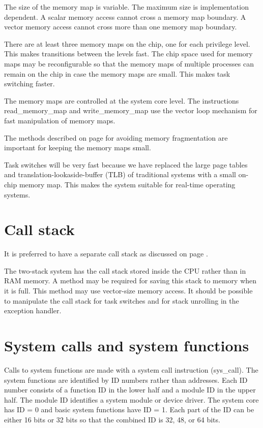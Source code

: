 \documentclass[forwardcom.tex]{subfiles}
\begin{document}
The size of the memory map is variable. The maximum size is implementation dependent.
A scalar memory access cannot cross a memory map boundary. A vector memory access cannot cross more than one memory map boundary.
\vspace{2mm}

There are at least three memory maps on the chip, one for each privilege level. This makes transitions between the levels fast. The chip space used for memory maps may be reconfigurable so that the memory maps of multiple processes can remain on the chip in case the memory maps are small. This makes task switching faster.
\vspace{2mm}

The memory maps are controlled at the system core level. The instructions read\_memory\_map and write\_memory\_map use the vector loop mechanism for fast manipulation of memory maps.
\vspace{2mm}

The methods described on page \pageref{memoryManagement} for avoiding memory fragmentation are important for keeping the memory maps small. 
\vspace{2mm}

Task switches will be very fast because we have replaced the large page tables and translation-lookaside-buffer (TLB) of traditional systems with a small on-chip memory map. This makes the system suitable for real-time operating systems.

\section{Call stack}
It is preferred to have a separate call stack as discussed on page \pageref{callStackAlternatives}. \vspace{2mm}

The two-stack system has the call stack stored inside the CPU rather than in RAM memory. A method may be required for saving this stack to memory when it is full. This method may use vector-size memory access. It should be possible to manipulate the call stack for task switches and for stack unrolling in the exception handler.

\section{System calls and system functions} \label{systemCallIDSystem}
Calls to system functions are made with a system call instruction (sys\_call). The system functions are identified by ID numbers rather than addresses. Each ID number consists of a function ID in the lower half and a module ID in the upper half. The module ID identifies a system module or device driver. The system core has ID = 0 and basic system functions have ID = 1. Each part of the ID can be either 16 bits or 32 bits so that the combined ID is 32, 48, or 64 bits. 
\vspace{2mm}
\end{document}
